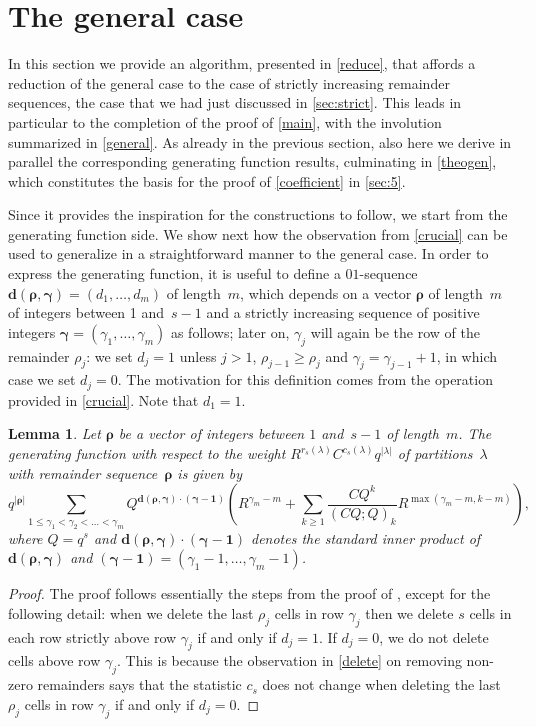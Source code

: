\documentclass[12pt,reqno]{amsart}
\numberwithin{equation}{section}
\newtheorem{lemma}[theorem]{Lemma}
\theoremstyle{definition}
\newcommand{\rem}{{\boldsymbol\rho}}
\newcommand{\pos}{{\boldsymbol\gamma}}
\newcommand{\posi}{{\gamma}}
\begin{document}
\section{The general case}\label{sec:general}
\label{sec:4}

In this section we provide an algorithm, presented in
\cref{reduce}, that affords a
reduction of the general case to the case of strictly increasing
remainder sequences, the case that we had just discussed in
\cref{sec:strict}. This leads in particular to the completion
of the proof of \cref{main}, with the involution summarized in
\cref{general}. As already in the previous section, also here
we derive in parallel the corresponding generating function
results, culminating in \cref{theogen}, which constitutes the
basis for the proof of \cref{coefficient} in \cref{sec:5}.

Since it provides the inspiration for the
constructions to follow, we start from the generating
function side.
We show next how the observation from \cref{crucial} can be
used to generalize  in a straightforward manner to the general case. In order to express the generating function, it is useful to define a $01$-sequence
${\mathbf d}(\rem,\pos)=(d_1,\dots,d_m)$ of length~$m$, which depends
on a vector $\rem$ of length~$m$ of integers between 1 and~$s-1$ and a strictly increasing sequence of positive integers
$\pos=(\posi_1,\dots,\posi_m)$ as follows; later on, $\posi_j$ will again be the row of the remainder $\rho_j$:  we set $d_j=1$ unless $j>1$, $\rho_{j-1} \ge \rho_j$ and $\posi_j=\posi_{j-1}+1$, in which case we set $d_j=0$. The motivation for this definition comes from the operation provided in \cref{crucial}. Note that $d_1=1$.

\begin{lemma}
\label{gen}
Let $\rem$ be a vector of integers between $1$ and~$s-1$ 
of length~$m$. The generating function
with respect to the
weight $R^{r_s(\lambda)} C^{c_s(\lambda)} q^{|\lambda|}$ of
partitions~$\lambda$ with remainder sequence~$\rem$ is given by
$$
q^{|\rem|} \sum_{1 \le \posi_1 < \posi_2 < \dots < \posi_m} Q^{{\mathbf d}(\rem,\pos) \cdot ({\pos - \mathbf 1})} \left( R^{\posi_m-m} +
\sum_{k \ge 1}  \frac{C Q^{k}}{(C Q; Q)_k}
 R^{\max(\posi_m-m,k-m)} \right),
$$
where $Q=q^s$ and\/
${\mathbf d}(\rem,\pos) \cdot ({\pos- \mathbf 1})$ denotes the standard inner
product of ${\mathbf d}(\rem,\pos)$ and
$(\pos- \mathbf 1) = (\posi_1-1,\dots,\posi_m-1)$.
\end{lemma}

\begin{proof}
The proof follows essentially the steps from the proof of , except for the following detail: when we delete the last $\rho_j$ cells in row $\posi_j$ then we delete $s$
cells in each row strictly above row $\posi_j$ if and only if
$d_j=1$. If $d_j=0$, we do not delete cells above row $\posi_j$. This
is because the observation in \cref{delete} on removing non-zero remainders says that the statistic $c_s$ does not change when deleting the last $\rho_j$ cells in row $\posi_j$ if and only if $d_j=0$.
\end{proof}
\end{document}

